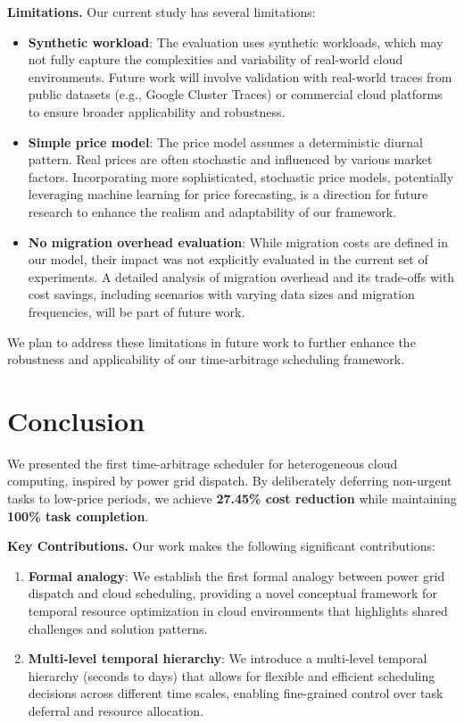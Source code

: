 \documentclass[10pt,conference]{IEEEtran}
\begin{document}
\textbf{Limitations.} Our current study has several limitations:
\begin{itemize}
    \item \textbf{Synthetic workload}: The evaluation uses synthetic workloads, which may not fully capture the complexities and variability of real-world cloud environments. Future work will involve validation with real-world traces from public datasets (e.g., Google Cluster Traces) or commercial cloud platforms to ensure broader applicability and robustness.
    \item \textbf{Simple price model}: The price model assumes a deterministic diurnal pattern. Real prices are often stochastic and influenced by various market factors. Incorporating more sophisticated, stochastic price models, potentially leveraging machine learning for price forecasting, is a direction for future research to enhance the realism and adaptability of our framework.
    \item \textbf{No migration overhead evaluation}: While migration costs are defined in our model, their impact was not explicitly evaluated in the current set of experiments. A detailed analysis of migration overhead and its trade-offs with cost savings, including scenarios with varying data sizes and migration frequencies, will be part of future work.
\end{itemize}
We plan to address these limitations in future work to further enhance the robustness and applicability of our time-arbitrage scheduling framework.

\section{Conclusion}
\label{sec:conclusion}

We presented the first time-arbitrage scheduler for heterogeneous cloud computing, inspired by power grid dispatch. By deliberately deferring non-urgent tasks to low-price periods, we achieve \textbf{27.45\% cost reduction} while maintaining \textbf{100\% task completion}.

\textbf{Key Contributions.} Our work makes the following significant contributions:
\begin{enumerate}
    \item \textbf{Formal analogy}: We establish the first formal analogy between power grid dispatch and cloud scheduling, providing a novel conceptual framework for temporal resource optimization in cloud environments that highlights shared challenges and solution patterns.
    \item \textbf{Multi-level temporal hierarchy}: We introduce a multi-level temporal hierarchy (seconds to days) that allows for flexible and efficient scheduling decisions across different time scales, enabling fine-grained control over task deferral and resource allocation.
\end{enumerate}
\end{document}
